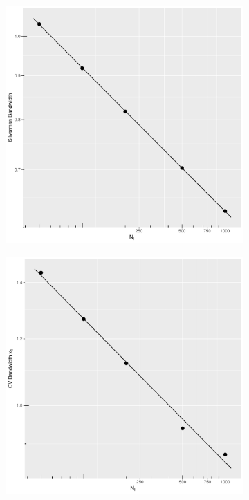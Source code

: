 \begin{figure}[htbp]
\begin{subfigure}[t]{0.195\textwidth}
    \end{subfigure}
    \begin{subfigure}[t]{0.195\textwidth}
        \centering
        \includegraphics[width=\textwidth]{results/by_h_per_mu/silverman_bandwidth_vs_mu.pdf}
    \end{subfigure}
    \begin{subfigure}[t]{0.195\textwidth}
        \centering
        \includegraphics[width=\textwidth]{results/by_h_per_mu/cv_bandwidth_x1_vs_mu.pdf}

\end{subfigure}
\end{figure}
